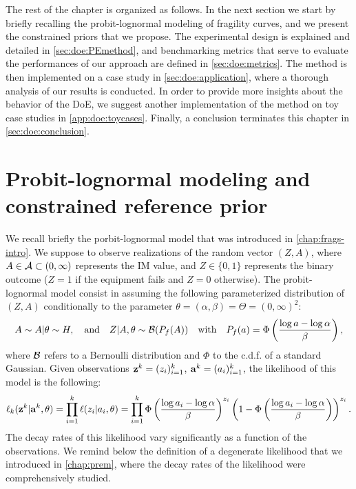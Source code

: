 The rest of the chapter is organized as follows. In the next section we start by briefly recalling the probit-lognormal modeling of fragility curves, and we 
present the constrained priors that we propose.
The experimental design is explained and detailed in \cref{sec:doe:PEmethod}, and benchmarking metrics that serve to evaluate the performances of our approach are defined in \cref{sec:doe:metrics}. 
The method is then implemented on a case study in \cref{sec:doe:application}, where a thorough analysis of our results is conducted.
In order to provide more insights about the behavior of the DoE, we suggest another implementation of the method on toy case studies in \cref{app:doe:toycases}. Finally, a conclusion terminates this chapter in \cref{sec:doe:conclusion}.






\section{Probit-lognormal modeling and constrained reference prior}\label{sec:doe:model}

We recall briefly the porbit-lognormal model that was introduced in \cref{chap:frags-intro}. We suppose to observe realizations of the random vector $(Z,A)$, where $A\in\mathcal{A}\subset(0,\infty)$ represents the IM value, and $Z\in\{0,1\}$ represents the binary outcome ($Z=1$ if the equipment fails and $Z=0$ otherwise).
The probit-lognormal model consist in assuming the following parameterized distribution of $(Z,A)$ conditionally to the parameter $\theta=(\alpha,\beta)=\Theta=(0,\infty)^2$:
    \begin{equation}
        A\sim A|\theta\sim H,\quad\text{and}\quad Z|A,\theta\sim\mathcal{B}(P_f(A))\quad\text{with}\quad P_f(a)=\Phi\left(\frac{\log a-\log\alpha}{\beta}\right),
    \end{equation}
where $\mathcal{B}$ refers to a Bernoulli distribution and $\Phi$ to the c.d.f. of a standard Gaussian.
Given observations $\mathbf{z}^k=(z_i)_{i=1}^k$, $\mathbf{a}^k=(a_i)_{i=1}^k$, the likelihood of this model is the following:
    \begin{equation}
        \ell_k(\mathbf{z}^k|\mathbf{a}^k,\theta) = \prod_{i=1}^{k}\ell(z_i|a_i,\theta) = \prod_{i=1}^k\Phi\left(\frac{\log a_i-\log\alpha}{\beta}\right)^{z_i}\left(1-\Phi\left(\frac{\log a_i-\log\alpha}{\beta}\right)\right)^{z_i}.
    \end{equation}
The decay rates of this likelihood vary significantly as a function of the observations. We remind below the definition of a degenerate likelihood that we introduced in \cref{chap:prem}, where the decay rates of the likelihood were comprehensively studied.

